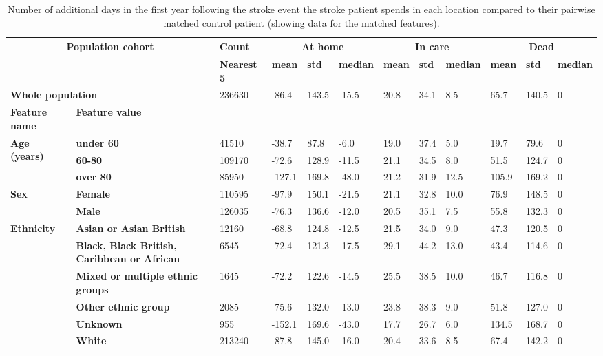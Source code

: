 \begin{landscape}
\begin{table}[!ht]
    \centering
    \begin{tabular}{|l|l|l|l|l|l|l|l|l|l|l|l|}
    \hline
        \multicolumn{2}{|c|}{\bf Population cohort} & \bf Count & \multicolumn{3}{|c|}{\bf At home} & \multicolumn{3}{|c|}{\bf In care} & \multicolumn{3}{|c|}{\bf Dead}\\ \hline
        \multicolumn{2}{|c|}{} & \bf Nearest 5 & \bf mean & \bf std & \bf median & \bf mean & \bf std & \bf median & \bf mean & \bf std & \bf median \\ \hline
        \multicolumn{2}{|l|}{\bf Whole population} & 236630 & -86.4 & 143.5 & -15.5 & 20.8 & 34.1 & 8.5 & 65.7 & 140.5 & 0 \\ \hline
        \bf Feature name & \bf Feature value & & & & & & & & & & \\ \hline
        \multirow{3}{*}{\bf Age (years)} & \bf under 60  &  41510 & -38.7 & 87.8 & -6.0 & 19.0 & 37.4 & 5.0 & 19.7 & 79.6 & 0\\
        ~ & \bf 60-80 & 109170 & -72.6 & 128.9 & -11.5 & 21.1 & 34.5 & 8.0 & 51.5 & 124.7 & 0 \\ 
        ~ & \bf over 80 & 85950 & -127.1 & 169.8 & -48.0 & 21.2 & 31.9 & 12.5 & 105.9 & 169.2 & 0 \\ \hline
        \multirow{2}{*}{\bf Sex} & \bf Female & 110595 & -97.9 & 150.1 & -21.5 & 21.1 & 32.8 & 10.0 & 76.9 & 148.5 & 0 \\ 
        ~ & \bf Male & 126035 & -76.3 & 136.6 & -12.0 & 20.5 & 35.1 & 7.5 & 55.8 & 132.3 & 0 \\ \hline
        \multirow{6}{*}{\bf Ethnicity} & \bf Asian or Asian British & 12160 & -68.8 & 124.8 & -12.5 & 21.5 & 34.0 & 9.0 & 47.3 & 120.5 & 0 \\ 
        ~ & \bf Black, Black British, Caribbean or African & 6545 & -72.4 & 121.3 & -17.5 & 29.1 & 44.2 & 13.0 & 43.4 & 114.6 & 0 \\
        ~ & \bf Mixed or multiple ethnic groups & 1645 & -72.2 & 122.6 & -14.5 & 25.5 & 38.5 & 10.0 & 46.7 & 116.8 & 0 \\ 
        ~ & \bf Other ethnic group & 2085 & -75.6 & 132.0 & -13.0 & 23.8 & 38.3 & 9.0 & 51.8 & 127.0 & 0 \\ 
        ~ & \bf Unknown & 955 & -152.1 & 169.6 & -43.0 & 17.7 & 26.7 & 6.0 & 134.5 & 168.7 & 0 \\
        ~ & \bf White & 213240 & -87.8 & 145.0 & -16.0 & 20.4 & 33.6 & 8.5 & 67.4 & 142.2 & 0 \\ \hline
    \end{tabular}
    \caption{Number of additional days in the first year following the stroke event the stroke patient spends in each location compared to their pairwise matched control patient (showing data for the matched features).}
    \label{tab:stroke_v_control_location_post_stroke}
\end{table}

\end{landscape}


